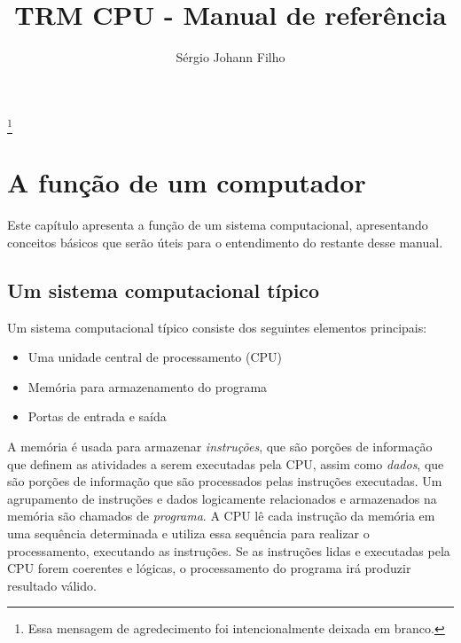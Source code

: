 \documentclass[11pt,a4paper]{report}
\begin{document}
\pagestyle{empty}
\title{\textbf{TRM CPU - Manual de referência}}
\author{Sérgio Johann Filho}

\maketitle

\thispagestyle{empty}
\thanks{Essa mensagem de agredecimento foi intencionalmente deixada em branco.}
\newpage

\tableofcontents

\pagestyle{fancy}
\fancyhf{}
\lhead[]{\thepage}
\rhead[\thepage]{}

\newpage
\thispagestyle{empty}

\chapter{A função de um computador}

Este capítulo apresenta a função de um sistema computacional, apresentando
conceitos básicos que serão úteis para o entendimento do restante desse manual.

\section{Um sistema computacional típico}

Um sistema computacional típico consiste dos seguintes elementos principais:

\begin{itemize}
\item Uma unidade central de processamento (CPU)
\item Memória para armazenamento do programa
\item Portas de entrada e saída
\end{itemize}

A memória é usada para armazenar \textit{instruções}, que são porções de
informação que definem as atividades a serem executadas pela CPU, assim
como \textit{dados}, que são porções de informação que são processados
pelas instruções executadas. Um agrupamento de instruções e dados logicamente
relacionados e armazenados na memória são chamados de \textit{programa}.
A CPU lê cada instrução da memória em uma sequência determinada e utiliza
essa sequência para realizar o processamento, executando as instruções.
Se as instruções lidas e executadas pela CPU forem coerentes e lógicas,
o processamento do programa irá produzir resultado válido.
\end{document}
